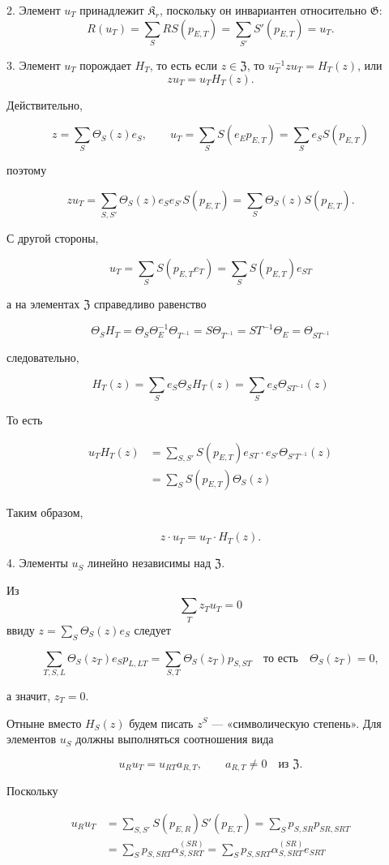 \documentclass[11pt]{article}
\begin{document}
2. Элемент \(u_T\) принадлежит \(\mathfrak K_r\), поскольку он инвариантен относительно \(\mathfrak G\):
\[
R(u_T)=\sum_S RS(p_{E,T})=\sum_{S'} S'(p_{E,T})=u_T.
\]

3. Элемент \(u_T\) порождает \(H_T\), то есть если \(z\in\mathfrak Z\), то \(u_T^{-1}zu_T=H_T(z)\), или
\[
z u_T=u_T H_T(z).
\]

Действительно,

\[
z=\sum_S\Theta_S(z)e_S,\qquad
u_T=\sum_S S(e_Ep_{E,T})=\sum_S e_S S(p_{E,T})
\]

поэтому

\[
zu_T=\sum_{S,S'}\Theta_S(z)e_Se_{S'}S(p_{E,T})
=\sum_S\Theta_S(z)S(p_{E,T}).
\]

С другой стороны,

\[
u_T=\sum_S S(p_{E,T}e_T)=\sum_S S(p_{E,T})e_{ST}
\]

а на элементах \(\mathfrak Z\) справедливо равенство

\[
\Theta_S H_T=\Theta_S\Theta_E^{-1}\Theta_{T^{-1}}
=S\Theta_{T^{-1}}=ST^{-1}\Theta_E=\Theta_{ST^{-1}}
\]

следовательно,

\[
H_T(z)=\sum_S e_S\Theta_S H_T(z)=\sum_S e_S\Theta_{ST^{-1}}(z)
\]

То есть

\[
\begin{aligned}
u_TH_T(z)
&=\sum_{S,S'} S(p_{E,T})e_{ST}\cdot e_{S'}\Theta_{S'T^{-1}}(z)\\
&=\sum_S S(p_{E,T})\Theta_S(z)
\end{aligned}
\]

Таким образом,

\[
z\cdot u_T=u_T\cdot H_T(z).
\]

4. Элементы \(u_S\) линейно независимы над \(\mathfrak Z\).

Из
\[
\sum_T z_Tu_T=0
\]
ввиду \(z=\sum_S\Theta_S(z)e_S\) следует

\[
\sum_{T,S,L}\Theta_S(z_T)e_Sp_{L,LT}
=\sum_{S,T}\Theta_S(z_T)p_{S,ST}\quad\text{то есть}\quad
\Theta_S(z_T)=0,
\]

а значит, \(z_T=0\).

Отныне вместо \(H_S(z)\) будем писать \(z^S\) --- «символическую степень». Для элементов \(u_S\) должны выполняться соотношения вида

\[
u_Ru_T=u_{RT}a_{R,T},\qquad a_{R,T}\ne0\quad\text{из }\mathfrak Z.
\]

Поскольку

\[
\begin{aligned}
u_Ru_T
&=\sum_{S,S'} S(p_{E,R})S'(p_{E,T})
=\sum_S p_{S,SR}p_{SR,SRT}\\
&=\sum_S p_{S,SRT}\alpha_{S,SRT}^{(SR)}
=\sum_S p_{S,SRT}\alpha_{S,SRT}^{(SR)}e_{SRT}
\end{aligned}
\]
\end{document}
